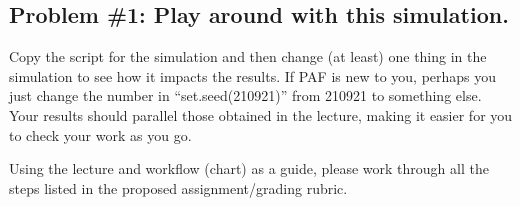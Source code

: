 \documentclass[
  english,
]{book}
\begin{document}
\hypertarget{problem-1-play-around-with-this-simulation.-4}{%
\subsection{Problem \#1: Play around with this simulation.}\label{problem-1-play-around-with-this-simulation.-4}}

Copy the script for the simulation and then change (at least) one thing in the simulation to see how it impacts the results. If PAF is new to you, perhaps you just change the number in ``set.seed(210921)'' from 210921 to something else. Your results should parallel those obtained in the lecture, making it easier for you to check your work as you go.

Using the lecture and workflow (chart) as a guide, please work through all the steps listed in the proposed assignment/grading rubric.
\end{document}
